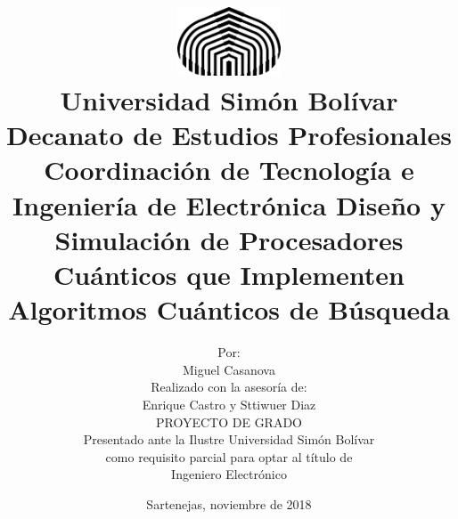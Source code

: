 \begin{titlepage}
    \title{\vspace{-2cm} \includegraphics[width=1.2in]{./usb.png} \\[.2cm]
        \large Universidad Simón Bolívar \\
        Decanato de Estudios Profesionales \\
        Coordinación de Tecnología e Ingeniería de Electrónica
        \vfill \LARGE Diseño y Simulación de Procesadores Cuánticos que Implementen Algoritmos Cuánticos de Búsqueda \vfill}
    \author{Por: \\
        Miguel Casanova \\
        Realizado con la asesoría de: \\
        Enrique Castro y Sttiwuer Diaz \\[1.2cm]
        PROYECTO DE GRADO \\
Presentado ante la Ilustre Universidad Simón Bolívar \\
como requisito parcial para optar al título de \\
Ingeniero Electrónico}
    \date{Sartenejas, noviembre de 2018}
\end{titlepage}
